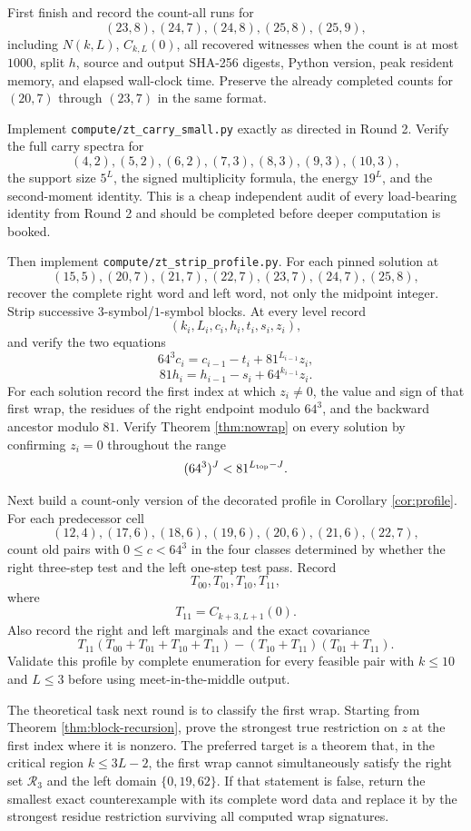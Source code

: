 \documentclass[11pt]{article}
\theoremstyle{remark}
\newcommand{\Rset}{\mathcal{R}}
\begin{document}
First finish and record the count-all runs for
\[
(23,8),(24,7),(24,8),(25,8),(25,9),
\]
including $N(k,L)$, $C_{k,L}(0)$, all recovered witnesses when the count is at most $1000$, split $h$, source and output SHA-256 digests, Python version, peak resident memory, and elapsed wall-clock time.  Preserve the already completed counts for $(20,7)$ through $(23,7)$ in the same format.

Implement \texttt{compute/zt\_carry\_small.py} exactly as directed in Round 2.  Verify the full carry spectra for
\[
(4,2),(5,2),(6,2),(7,3),(8,3),(9,3),(10,3),
\]
the support size $5^L$, the signed multiplicity formula, the energy $19^L$, and the second-moment identity.  This is a cheap independent audit of every load-bearing identity from Round 2 and should be completed before deeper computation is booked.

Then implement \texttt{compute/zt\_strip\_profile.py}.  For each pinned solution at
\[
(15,5),(20,7),(21,7),(22,7),(23,7),(24,7),(25,8),
\]
recover the complete right word and left word, not only the midpoint integer.  Strip successive $3$-symbol/$1$-symbol blocks.  At every level record
\[
(k_i,L_i,c_i,h_i,t_i,s_i,z_i),
\]
and verify the two equations
\[
64^3c_i=c_{i-1}-t_i+81^{L_{i-1}}z_i,
\]
\[
81h_i=h_{i-1}-s_i+64^{k_{i-1}}z_i.
\]
For each solution record the first index at which $z_i\ne0$, the value and sign of that first wrap, the residues of the right endpoint modulo $64^3$, and the backward ancestor modulo $81$.  Verify Theorem \ref{thm:nowrap} on every solution by confirming $z_i=0$ throughout the range
\[
(64^3)^J<81^{L_{\rm top}-J}.
\]

Next build a count-only version of the decorated profile in Corollary \ref{cor:profile}.  For each predecessor cell
\[
(12,4),(17,6),(18,6),(19,6),(20,6),(21,6),(22,7),
\]
count old pairs with $0\le c<64^3$ in the four classes determined by whether the right three-step test and the left one-step test pass.  Record
\[
T_{00},T_{01},T_{10},T_{11},
\]
where
\[
T_{11}=C_{k+3,L+1}(0).
\]
Also record the right and left marginals and the exact covariance
\[
T_{11}(T_{00}+T_{01}+T_{10}+T_{11})
-(T_{10}+T_{11})(T_{01}+T_{11}).
\]
Validate this profile by complete enumeration for every feasible pair with $k\le10$ and $L\le3$ before using meet-in-the-middle output.

The theoretical task next round is to classify the first wrap.  Starting from Theorem \ref{thm:block-recursion}, prove the strongest true restriction on $z$ at the first index where it is nonzero.  The preferred target is a theorem that, in the critical region $k\le3L-2$, the first wrap cannot simultaneously satisfy the right set $\Rset_3$ and the left domain $\{0,19,62\}$.  If that statement is false, return the smallest exact counterexample with its complete word data and replace it by the strongest residue restriction surviving all computed wrap signatures.
\end{document}
